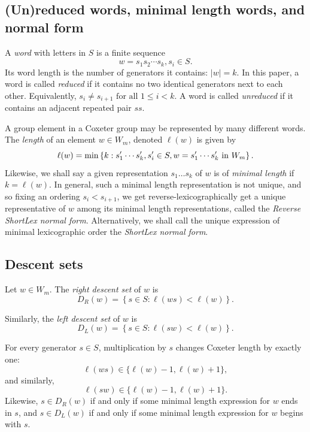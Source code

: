 \documentclass{article}
\begin{document}
\subsection{(Un)reduced words, minimal length words, and normal form} 
\label{sec:reduced-unreduced-words}
A \emph{word} with letters in $S$ is a finite sequence \[ w=s_1s_2\cdots s_k, s_i\in S. \] Its word length is the number of generators it contains: $|w|=k.$ In this paper, a word is called \emph{reduced} if it contains no two identical generators next to each other. Equivalently, $ s_i\neq s_{i+1} \text{ for all }1\leq i<k.$ 
A word is called \emph{unreduced} if it contains an adjacent repeated pair $ss$. 

A group element in a Coxeter group may be represented by many different words. The \emph{length} of an element $w\in W_m$, denoted $\ell(w)$ is given by \[ \ell(w) = \min \left\{ k: s'_1\cdots s'_k, s'_i\in S, w = s'_1\cdots s'_k \textup{ in } W_m \right\}. \] Likewise, we shall say a given representation $s_1\ldots s_k$ of $w$ is of \textit{minimal length} if $k=\ell(w)$. In general, such a minimal length representation is not unique, and so fixing an ordering $s_{i}<s_{i+1}$, we get reverse-lexicographically get a unique representative of $w$ among its minimal length representations, called the \textit{Reverse ShortLex normal form}. Alternatively, we shall call the unique expression of minimal lexicographic order the \textit{ShortLex normal form}.
\subsection{Descent sets} 
\label{sec:descent-sets}
Let $w\in W_m$. The \emph{right descent set} of $w$ is 
\[ 
D_R(w) = \left\{ s\in S: \ell(ws)<\ell(w) \right\}. 
\] 

Similarly, the \emph{left descent set} of $w$ is 
\[ 
D_L(w) = \left\{ s\in S: \ell(sw)<\ell(w) \right\}. 
\]

For every generator $s\in S$, multiplication by $s$ changes Coxeter length by exactly one: 
\[ 
\ell(ws)\in\{\ell(w)-1,\ell(w)+1\}, 
\]
and similarly, 
\[ 
\ell(sw)\in\{\ell(w)-1,\ell(w)+1\}. 
\] 
Likewise, $s\in D_R(w)$ if and only if some minimal length expression for $w$ ends in $s$, and $s\in D_L(w)$ if and only if some minimal length expression for $w$ begins with $s$.
\end{document}
